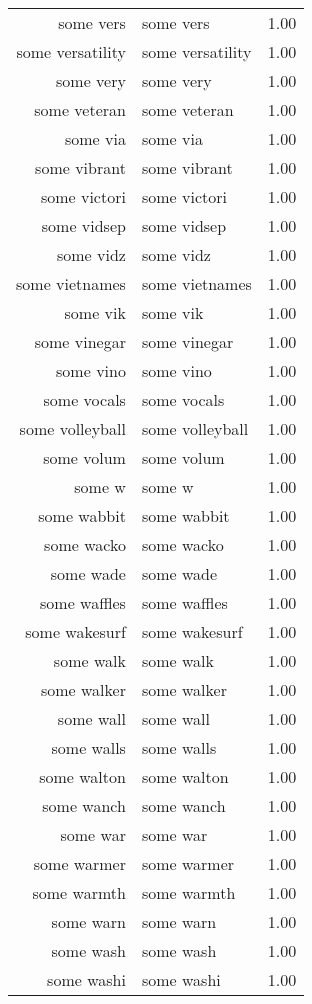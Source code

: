 \begin{table}[ht]
\begin{tabular}{rlr}
  some vers & some vers & 1.00 \\ 
  some versatility & some versatility & 1.00 \\ 
  some very & some very & 1.00 \\ 
  some veteran & some veteran & 1.00 \\ 
  some via & some via & 1.00 \\ 
  some vibrant & some vibrant & 1.00 \\ 
  some victori & some victori & 1.00 \\ 
  some vidsep & some vidsep & 1.00 \\ 
  some vidz & some vidz & 1.00 \\ 
  some vietnames & some vietnames & 1.00 \\ 
  some vik & some vik & 1.00 \\ 
  some vinegar & some vinegar & 1.00 \\ 
  some vino & some vino & 1.00 \\ 
  some vocals & some vocals & 1.00 \\ 
  some volleyball & some volleyball & 1.00 \\ 
  some volum & some volum & 1.00 \\ 
  some w & some w & 1.00 \\ 
  some wabbit & some wabbit & 1.00 \\ 
  some wacko & some wacko & 1.00 \\ 
  some wade & some wade & 1.00 \\ 
  some waffles & some waffles & 1.00 \\ 
  some wakesurf & some wakesurf & 1.00 \\ 
  some walk & some walk & 1.00 \\ 
  some walker & some walker & 1.00 \\ 
  some wall & some wall & 1.00 \\ 
  some walls & some walls & 1.00 \\ 
  some walton & some walton & 1.00 \\ 
  some wanch & some wanch & 1.00 \\ 
  some war & some war & 1.00 \\ 
  some warmer & some warmer & 1.00 \\ 
  some warmth & some warmth & 1.00 \\ 
  some warn & some warn & 1.00 \\ 
  some wash & some wash & 1.00 \\ 
  some washi & some washi & 1.00 \\ 

\end{tabular}
\end{table}
